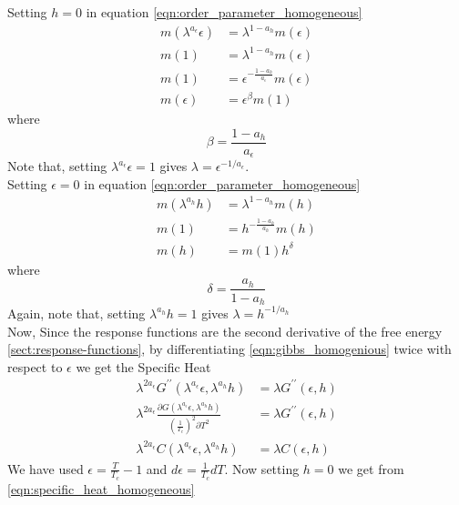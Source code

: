 	Setting $h=0$ in equation \ref{eqn:order_parameter_homogeneous}
	\begin{align}
		m(\lambda^{a_\epsilon} \epsilon)	 &= \lambda^{1-a_h} m(\epsilon) \nonumber \\
		m(1)	 &= \lambda^{1-a_h} m(\epsilon) \nonumber \\
		m(1)	 &= \epsilon^{-\frac{1-a_h}{a_\epsilon}} m(\epsilon) \nonumber \\
		m(\epsilon) &= \epsilon^\beta m(1) \label{eqn:order_parameter_and_beta}
	\end{align}
	where
	\begin{equation}
		\beta = \frac{1-a_h}{a_\epsilon}
		\label{eqn:beta}
	\end{equation}
	Note that, setting $\lambda^{a_\epsilon} \epsilon = 1$ gives $\lambda = \epsilon^{-1/a_\epsilon}$.\\
	Setting $\epsilon=0$ in equation \ref{eqn:order_parameter_homogeneous}
	\begin{align}
		m(\lambda^{a_h} h) &= \lambda^{1-a_h} m(h) \nonumber \\
		m(1) &= h^{-\frac{1-a_h}{a_h}} m(h) \nonumber \\
		m(h) &= m(1) h^\delta \label{eqn:order_parameter_and_delta}
	\end{align}
	where
	\begin{equation}
		\delta = \frac{a_h}{1-a_h}
		\label{eqn:delta}
	\end{equation}
	Again, note that, setting $\lambda^{a_h} h = 1$ gives $\lambda = h^{-1/a_h}$\\
	Now, Since the response functions are the second derivative of the free energy \ref{sect:response-functions}, by differentiating \ref{eqn:gibbs_homogenious} twice with respect to $\epsilon$ we get the Specific Heat
	\begin{align}
		\lambda^{2 a_\epsilon} G^{\prime\prime}(\lambda^{a_\epsilon} \epsilon, \lambda^{a_h} h) &= \lambda G^{\prime \prime}(\epsilon, h) \nonumber \\
		\lambda^{2 a_\epsilon} \frac{\partial G(\lambda^{a_\epsilon} \epsilon, \lambda^{a_h} h)}{\left(\frac{1}{T_c}\right)^2 \partial T^2} &= \lambda G^{\prime \prime}(\epsilon, h) \nonumber \\
		\lambda^{2 a_\epsilon} C(\lambda^{a_\epsilon} \epsilon, \lambda^{a_h} h) &= \lambda C(\epsilon, h)
		\label{eqn:specific_heat_homogeneous}
	\end{align}
	We have used $\epsilon = \frac{T}{T_c} -1$ and $d\epsilon = \frac{1}{T_c} dT$. Now setting $h=0$ we get from \ref{eqn:specific_heat_homogeneous}
